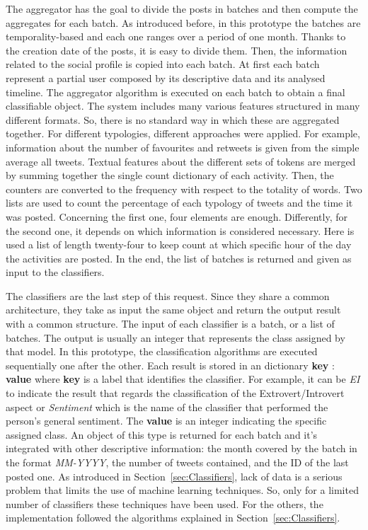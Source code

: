 The aggregator has the goal to divide the posts in batches and then compute the aggregates for each batch.
As introduced before, in this prototype the batches are temporality-based and each one ranges over a period of one month.
Thanks to the creation date of the posts, it is easy to divide them. Then, the information related to the social profile is copied into each batch.
At first each batch represent a partial user composed by its descriptive data and its analysed timeline.
The aggregator algorithm is executed on each batch to obtain a final classifiable object.
The system includes many various features structured in many different formats. So, there is no standard way in which these are aggregated together.
For different typologies, different approaches were applied.
For example, information about the number of favourites and retweets is given from the simple average all tweets. Textual features about the different sets of tokens are merged by summing together the single count dictionary of each activity. Then, the counters are converted to the frequency with respect to the totality of words. 
Two lists are used to count the percentage of each typology of tweets and the time it was posted. Concerning the first one, four elements are enough. Differently, for the second one, it depends on which information is considered necessary.
Here is used a list of length twenty-four to keep count at which specific hour of the day the activities are posted.
In the end, the list of batches is returned and given as input to the classifiers.

The classifiers are the last step of this request. Since they share a common architecture, they take as input the same object and return the output result with a common structure.
The input of each classifier is a batch, or a list of batches. The output is usually an integer that represents the class assigned by that model.
In this prototype, the classification algorithms are executed sequentially one after the other. Each result is stored in an dictionary {\textbf{key} : \textbf{value}} where \textbf{key} is a label that identifies the classifier. For example, it can be \textit{EI} to indicate the result that regards the classification of the Extrovert/Introvert aspect or \textit{Sentiment} which is the name of the classifier that performed the person's general sentiment.
The \textbf{value} is an integer indicating the specific assigned class.
An object of this type is returned for each batch and it's integrated with other descriptive information: the month covered by the batch in the format \textit{MM-YYYY}, the number of tweets contained, and the ID of the last posted one.
As introduced in Section~\ref{sec:Classifiers}, lack of data is a serious problem that limits the use of machine learning techniques. So, only for a limited number of classifiers these techniques have been used.
For the others, the implementation followed the algorithms explained in Section~\ref{sec:Classifiers}. 

